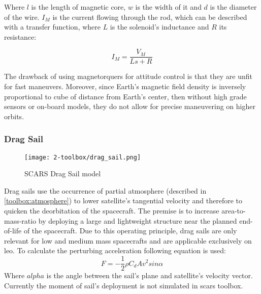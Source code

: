         Where $l$ is the length of magnetic core, $w$ is the width of it and $d$ is the diameter of the wire. $I_M$ is the current flowing through the rod, which can be described with a transfer function, where $L$ is the solenoid's inductance and $R$ its resistance:

        \begin{equation}
            I_M = \frac{V_M}{Ls+R}
        \end{equation}



        The drawback of using magnetorquers for attitude control is that they are unfit for fast maneuvers. Moreover, since Earth's magnetic field density is inversely proportional to cube of distance from Earth's center, then without high grade sensors or on-board models, they do not allow for precise maneuvering on higher orbits.


    \subsubsection{Drag Sail}
        \begin{figure}[H]
            \centering
            \texttt{[image: 2-toolbox/drag\_sail.png]}
            \caption{SCARS Drag Sail model}
            \label{fig:drag_sail}
        \end{figure}

        Drag sails use the occurrence of partial atmosphere (described in \ref{toolbox:atmosphere}) to lower satellite's tangential velocity and therefore to quicken the deorbitation of the spacecraft. The premise is to increase area-to-mass-ratio by deploying a large and lightweight structure near the planned end-of-life of the spacecraft. Due to this operating principle, drag sails are only relevant for low and medium mass spacecrafts and are applicable exclusively on \ac{leo}. To calculate the perturbing acceleration following equation is used:
        \begin{equation}
            F = -\frac{1}{2}\rho C_d A v^2sin\alpha
        \end{equation}
        Where $alpha$ is the angle between the sail's plane and satellite's velocity vector. Currently the moment of sail's deployment is not simulated in \ac{scars} toolbox.

